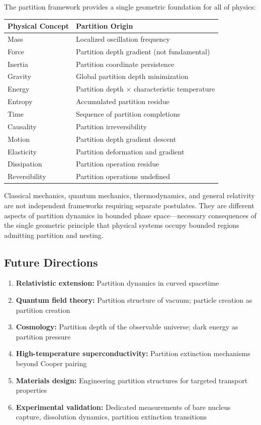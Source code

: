 \documentclass[twocolumn,10pt,a4paper]{article}
\theoremstyle{definition}
\theoremstyle{remark}
\begin{document}
The partition framework provides a single geometric foundation for all of physics:

\begin{center}
\begin{tabular}{ll}
\toprule
\textbf{Physical Concept} & \textbf{Partition Origin} \\
\midrule
Mass & Localized oscillation frequency \\
Force & Partition depth gradient (not fundamental) \\
Inertia & Partition coordinate persistence \\
Gravity & Global partition depth minimization \\
Energy & Partition depth $\times$ characteristic temperature \\
Entropy & Accumulated partition residue \\
Time & Sequence of partition completions \\
Causality & Partition irreversibility \\
Motion & Partition depth gradient descent \\
Elasticity & Partition deformation and gradient \\
Dissipation & Partition operation residue \\
Reversibility & Partition operations undefined \\
\bottomrule
\end{tabular}
\end{center}

Classical mechanics, quantum mechanics, thermodynamics, and general relativity are not independent frameworks requiring separate postulates. They are different aspects of partition dynamics in bounded phase space---necessary consequences of the single geometric principle that physical systems occupy bounded regions admitting partition and nesting.

\subsection{Future Directions}

\begin{enumerate}
    \item \textbf{Relativistic extension:} Partition dynamics in curved spacetime
    \item \textbf{Quantum field theory:} Partition structure of vacuum; particle creation as partition creation
    \item \textbf{Cosmology:} Partition depth of the observable universe; dark energy as partition pressure
    \item \textbf{High-temperature superconductivity:} Partition extinction mechanisms beyond Cooper pairing
    \item \textbf{Materials design:} Engineering partition structures for targeted transport properties
    \item \textbf{Experimental validation:} Dedicated measurements of bare nucleus capture, dissolution dynamics, partition extinction transitions
\end{enumerate}
\end{document}
